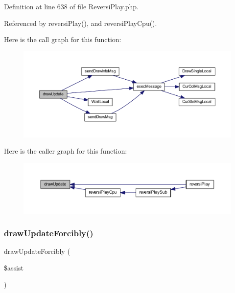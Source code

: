 Definition at line 638 of file Reversi\+Play.\+php.



Referenced by reversi\+Play(), and reversi\+Play\+Cpu().

Here is the call graph for this function\+:\nopagebreak
\begin{figure}[H]
\begin{center}
\leavevmode
\includegraphics[width=350pt]{class_reversi_play_a52029e5f2e049767d1f67c3f5c18ce9f_cgraph}
\end{center}
\end{figure}
Here is the caller graph for this function\+:\nopagebreak
\begin{figure}[H]
\begin{center}
\leavevmode
\includegraphics[width=350pt]{class_reversi_play_a52029e5f2e049767d1f67c3f5c18ce9f_icgraph}
\end{center}
\end{figure}
\mbox{\label{class_reversi_play_a3ae28eb121caf59932218ea7d1fca81d}} 
\subsubsection{\texorpdfstring{draw\+Update\+Forcibly()}{drawUpdateForcibly()}}
{\footnotesize\ttfamily draw\+Update\+Forcibly (\begin{DoxyParamCaption}\item[{}]{\$assist }\end{DoxyParamCaption})}



